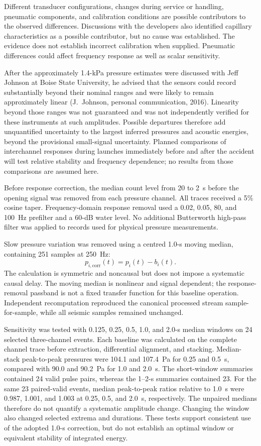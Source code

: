 \documentclass[]{seismica}
\begin{document}
Different transducer configurations, changes during service or handling,
pneumatic components, and calibration conditions are possible contributors
to the observed differences. Discussions with the developers also identified
capillary characteristics as a possible contributor, but no cause was
established. The evidence does not establish incorrect calibration when
supplied. Pneumatic differences could affect frequency response as well as
scalar sensitivity.

After the approximately 1.4-kPa pressure estimates were discussed with Jeff
Johnson at Boise State University, he advised that the sensors could record
substantially beyond their nominal ranges and were likely to remain
approximately linear (J.~Johnson, personal communication, 2016). Linearity
beyond those ranges was not guaranteed and was not independently verified
for these instruments at such amplitudes. Possible departures therefore add
unquantified uncertainty to the largest inferred pressures and acoustic
energies, beyond the provisional small-signal uncertainty. Planned comparisons
of interchannel responses during launches immediately before and after the
accident will test relative stability and frequency dependence; no results
from those comparisons are assumed here.

Before response correction, the median count level from 20 to 2~s before the
opening signal was removed from each pressure channel. All traces received a
5\% cosine taper. Frequency-domain response removal used a 0.02, 0.05, 80, and
100~Hz prefilter and a 60-dB water level. No additional Butterworth high-pass
filter was applied to records used for physical pressure measurements.

Slow pressure variation was removed using a centred 1.0-s moving median,
containing 251 samples at 250~Hz:
\begin{equation}
 p_{i,\mathrm{corr}}(t)=p_i(t)-b_i(t).
\end{equation}
The calculation is symmetric and noncausal but does not impose a systematic
causal delay. The moving median is nonlinear and signal dependent; the
response-removal passband is not a fixed transfer function for this baseline
operation. Independent recomputation reproduced the canonical processed
stream sample-for-sample, while all seismic samples remained unchanged.

Sensitivity was tested with 0.125, 0.25, 0.5, 1.0, and 2.0-s median windows on
24 selected three-channel events. Each baseline was calculated on the complete
channel trace before extraction, differential alignment, and stacking.
Median-stack peak-to-peak pressures were 104.1 and 107.4~Pa for 0.25 and
0.5~s, compared with 90.0 and 90.2~Pa for 1.0 and 2.0~s. The short-window
summaries contained 24 valid pulse pairs, whereas the 1--2-s summaries contained
23. For the same 23 paired-valid events, median peak-to-peak ratios relative
to 1.0~s were 0.987, 1.001, and 1.003 at 0.25, 0.5, and 2.0~s, respectively.
The unpaired medians therefore do not quantify a systematic amplitude change.
Changing the window
also changed selected extrema and durations. These tests support consistent
use of the adopted 1.0-s correction, but do not establish an optimal window
or equivalent stability of integrated energy.
\end{document}
